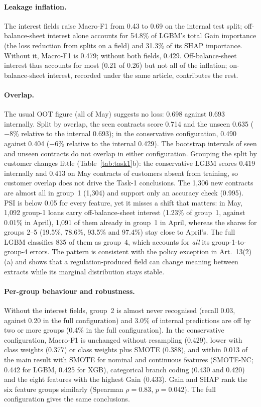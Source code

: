 \documentclass[runningheads]{llncs}
\begin{document}
\paragraph{Leakage inflation.} The interest fields raise Macro-F1 from 0.43 to 0.69 on the internal test split; off-balance-sheet interest alone accounts for 54.8\% of LGBM's total Gain importance (the loss reduction from splits on a field) and 31.3\% of its SHAP importance. Without it, Macro-F1 is 0.479; without both fields, 0.429. Off-balance-sheet interest thus accounts for most (0.21 of 0.26) but not all of the inflation; on-balance-sheet interest, recorded under the same article, contributes the rest. 

\paragraph{Overlap.} The usual OOT figure (all of May) suggests no loss: 0.698 against 0.693 internally. Split by overlap, the seen contracts score 0.714 and the unseen 0.635 ($-8\%$ relative to the internal 0.693); in the conservative configuration, 0.490 against 0.404 ($-6\%$ relative to the internal 0.429). The bootstrap intervals of seen and unseen contracts do not overlap in either configuration. Grouping the split by customer changes little (Table~\ref{tab:task1}b): the conservative LGBM scores 0.419 internally and 0.413 on May contracts of customers absent from training, so customer overlap does not drive the Task-1 conclusions. The 1,306 new contracts are almost all in group~1 (1,304) and support only an accuracy check (0.995). PSI is below 0.05 for every feature, yet it misses a shift that matters: in May, 1,092 group-1 loans carry off-balance-sheet interest (1.23\% of group~1, against 0.01\% in April), 1,091 of them already in group~1 in April, whereas the shares for groups 2--5 (19.5\%, 78.6\%, 93.5\% and 97.4\%) stay close to April's. The full LGBM classifies 835 of them as group~4, which accounts for \emph{all} its group-1-to-group-4 errors. The pattern is consistent with the policy exception in Art.~13(2)(a) and shows that a regulation-produced field can change meaning between extracts while its marginal distribution stays stable.

\paragraph{Per-group behaviour and robustness.} Without the interest fields, group~2 is almost never recognised (recall 0.03, against 0.20 in the full configuration) and 3.0\% of internal predictions are off by two or more groups (0.4\% in the full configuration). In the conservative configuration, Macro-F1 is unchanged without resampling (0.429), lower with class weights (0.377) or class weights plus SMOTE (0.388), and within 0.013 of the main result with SMOTE for nominal and continuous features (SMOTE-NC; 0.442 for LGBM, 0.425 for XGB), categorical branch coding (0.430 and 0.420) and the eight features with the highest Gain (0.433). Gain and SHAP rank the six feature groups similarly (Spearman $\rho=0.83$, $p=0.042$). The full configuration gives the same conclusions.
\end{document}
